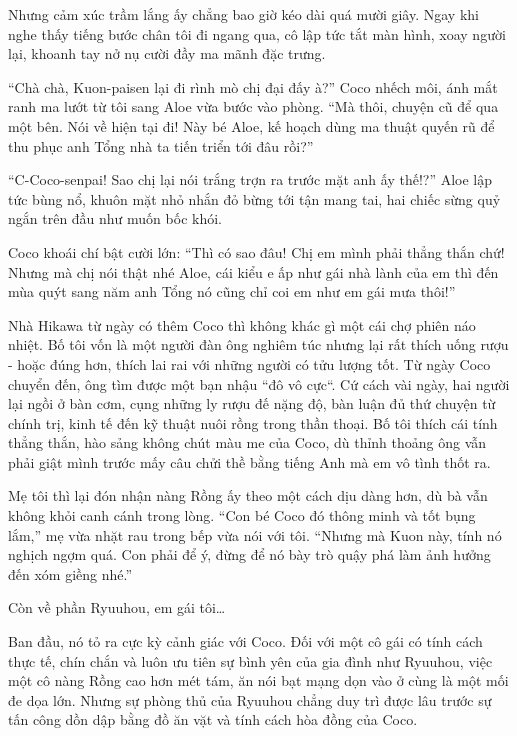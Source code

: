 \documentclass[../main.tex]{subfiles}
\begin{document}
Nhưng cảm xúc trầm lắng ấy chẳng bao giờ kéo dài quá mười giây. Ngay khi nghe thấy tiếng bước chân tôi đi ngang qua, cô lập tức tắt màn hình, xoay người lại, khoanh tay nở nụ cười đầy ma mãnh đặc trưng.

``Chà chà, Kuon-paisen lại đi rình mò chị đại đấy à?'' Coco nhếch môi, ánh mắt ranh ma lướt từ tôi sang Aloe vừa bước vào phòng. ``Mà thôi, chuyện cũ để qua một bên. Nói về hiện tại đi! Này bé Aloe, kế hoạch dùng ma thuật quyến rũ để thu phục anh Tổng nhà ta tiến triển tới đâu rồi?''

``C-Coco-senpai! Sao chị lại nói trắng trợn ra trước mặt anh ấy thế!?'' Aloe lập tức bùng nổ, khuôn mặt nhỏ nhắn đỏ bừng tới tận mang tai, hai chiếc sừng quỷ ngắn trên đầu như muốn bốc khói.

Coco khoái chí bật cười lớn: ``Thì có sao đâu! Chị em mình phải thẳng thắn chứ! Nhưng mà chị nói thật nhé Aloe, cái kiểu e ấp như gái nhà lành của em thì đến mùa quýt sang năm anh Tổng nó cũng chỉ coi em như em gái mưa thôi!''

\ct

Nhà Hikawa từ ngày có thêm Coco thì không khác gì một cái chợ phiên náo nhiệt. Bố tôi vốn là một người đàn ông nghiêm túc nhưng lại rất thích uống rượu - hoặc đúng hơn, thích lai rai với những người có tửu lượng tốt. Từ ngày Coco chuyển đến, ông tìm được một bạn nhậu ``đô vô cực``. Cứ cách vài ngày, hai người lại ngồi ở bàn cơm, cụng những ly rượu đế nặng độ, bàn luận đủ thứ chuyện từ chính trị, kinh tế đến kỹ thuật nuôi rồng trong thần thoại. Bố tôi thích cái tính thẳng thắn, hào sảng không chút màu me của Coco, dù thỉnh thoảng ông vẫn phải giật mình trước mấy câu chửi thề bằng tiếng Anh mà em vô tình thốt ra.

Mẹ tôi thì lại đón nhận nàng Rồng ấy theo một cách dịu dàng hơn, dù bà vẫn không khỏi canh cánh trong lòng. ``Con bé Coco đó thông minh và tốt bụng lắm,'' mẹ vừa nhặt rau trong bếp vừa nói với tôi. ``Nhưng mà Kuon này, tính nó nghịch ngợm quá. Con phải để ý, đừng để nó bày trò quậy phá làm ảnh hưởng đến xóm giềng nhé.''

Còn về phần Ryuuhou, em gái tôi\dots

Ban đầu, nó tỏ ra cực kỳ cảnh giác với Coco. Đối với một cô gái có tính cách thực tế, chín chắn và luôn ưu tiên sự bình yên của gia đình như Ryuuhou, việc một cô nàng Rồng cao hơn mét tám, ăn nói bạt mạng dọn vào ở cùng là một mối đe dọa lớn. Nhưng sự phòng thủ của Ryuuhou chẳng duy trì được lâu trước sự tấn công dồn dập bằng đồ ăn vặt và tính cách hòa đồng của Coco.
\end{document}
